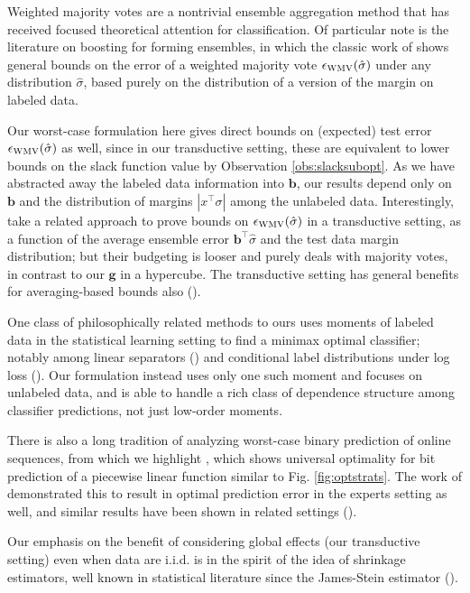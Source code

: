 \documentclass{colt2019} %
\newcommand{\vb}{\mathbf{b}}
\newcommand{\vg}{\mathbf{g}}
\newcommand{\vz}{\mathbf{z}}
\newcommand{\abs}[1]{\left| #1 \right|}
\newcommand{\wmv}{\textsc{WMV}}
\newcommand{\sighat}{\hat{\sigma}}
\newcommand{\lrp}[1]{\left(#1\right)}
\renewcommand{\comment}[3]{\marginpar{\textcolor{#2}{#1: #3}}}
\newcommand{\akshay}[1]{\comment{Akshay}{orange}{#1}}
\begin{document}

Weighted majority votes are a nontrivial ensemble aggregation method 
that has received focused theoretical attention for classification. 
Of particular note is the literature on boosting for forming ensembles, 
in which the classic work of \cite{SFBL98} shows general bounds 
on the error of a weighted majority vote $\epsilon_{\wmv} (\sighat)$ under any distribution $\sighat$,
based purely on the distribution of a version of the margin on labeled data. 

Our worst-case formulation here gives direct bounds on (expected) test error $\epsilon_{\wmv} (\sighat)$ as well, 
since in our transductive setting, these are equivalent to lower bounds on the slack function value by Observation \ref{obs:slacksubopt}. 
As we have abstracted away the labeled data information into $\vb$, our results depend only on $\vb$ and 
the distribution of margins $\abs{x^\top \sigma}$ among the unlabeled data. 
Interestingly, \cite{AUL09} take a related approach to prove bounds on $\epsilon_{\wmv} (\sighat)$  
in a transductive setting, as a function of the average ensemble error $\vb^\top \sighat$ and the test data margin distribution; 
but their budgeting is looser and purely deals with majority votes, 
in contrast to our $\vg$ in a hypercube. 
The transductive setting has general benefits for averaging-based bounds also (\cite{BL03}).

One class of philosophically related methods to ours uses moments of labeled data 
in the statistical learning setting to find a minimax optimal classifier; 
notably among linear separators (\cite{LGBJ01}) and conditional label distributions under log loss (\cite{LZ14}). 
Our formulation instead uses only one such moment and focuses on unlabeled data, and is able to handle 
a rich class of dependence structure among classifier predictions, not just low-order moments. 

There is also a long tradition of analyzing worst-case binary prediction of online sequences, 
from which we highlight \cite{FMG92}, 
which shows universal optimality for bit prediction of a piecewise linear function similar to Fig. \ref{fig:optstrats}. 
The work of \cite{CBFHHSW93} demonstrated this to result in optimal prediction error 
in the experts setting as well, and similar results have been shown in related settings (\cite{V90, AP13}). 

Our emphasis on the benefit of considering global effects (our transductive setting) even when data are i.i.d. 
is in the spirit of the idea of shrinkage estimators, well known in statistical literature since the James-Stein estimator (\cite{EM77}).
\fi


{}
\end{document}
